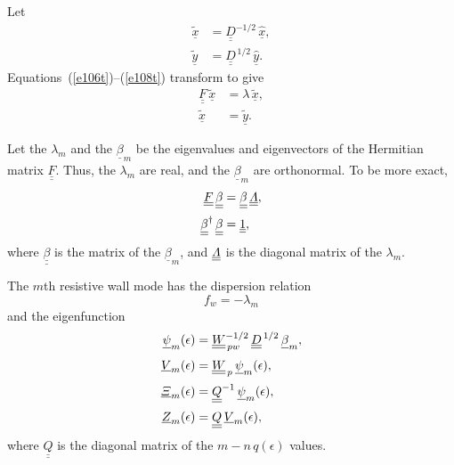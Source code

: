 \documentclass[12pt,prb,aps,notitlepage]{revtex4-1}
\begin{document}
Let
\begin{align}
\underline{\tilde{x}}&= \underline{\underline{D}}^{-1/2}\,\underline{\hat{x}},\\[0.5ex]
\underline{\tilde{y}}&= \underline{\underline{D}}^{\,1/2}\,\underline{\hat{y}}.
\end{align}
Equations~(\ref{e106t})--(\ref{e108t}) transform to give
\begin{align}
\underline{\underline{F}}\,\underline{\tilde{x}} &=\lambda\,\underline{\tilde{x}},\\[0.5ex]
\underline{\tilde{x}} &= \underline{\tilde{y}}.
\end{align}

Let the $\lambda_m$ and the $\underline{\beta}_m$ be the eigenvalues and eigenvectors of the Hermitian matrix $\underline{\underline{F}}$. 
Thus, the $\lambda_m$ are real, and the $\underline{\beta}_m$ are orthonormal. To be more exact, 
\begin{align}
\underline{\underline{F}}\,\underline{\underline{\beta}}&= \underline{\underline{\beta}}\, \underline{\underline{\mit\Lambda}},\\[0.5ex]
\underline{\underline{\beta}}^\dag \,\underline{\underline{\beta}}&= \underline{\underline{1}},
\end{align}
where $\underline{\underline{\beta}}$ is the matrix of the $\underline{\beta}_m$, and $\underline{\underline{\mit\Lambda}}$ is the diagonal
matrix of the $\lambda_m$. 

The $m$th resistive wall mode has the dispersion relation
\begin{equation}
f_w =- \lambda_m
\end{equation}
and the eigenfunction
\begin{align}
\underline{\psi}_m(\epsilon) &=  \underline{\underline{W}}_{\,pw}^{-1/2}\, \underline{\underline{D}}^{\,1/2}\,\underline{\beta}_m,\\[0.5ex]
\underline{V}_m(\epsilon) &= \underline{\underline{W}}_{\,p}\,\underline{\psi}_m(\epsilon),\\[0.5ex]
\underline{\mit\Xi}_m(\epsilon)&=  \underline{\underline{Q}}^{-1}\,\underline{\psi}_m(\epsilon),\\[0.5ex]
\underline{Z}_m(\epsilon)&= \underline{\underline{Q}}\,\underline{V}_m(\epsilon),
\end{align}
where  $\underline{\underline{Q}}$ is the diagonal matrix of the $m-n\,q(\epsilon)$ values. 
\end{document}
